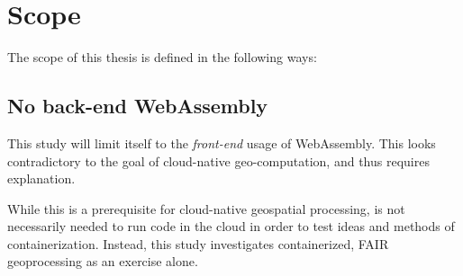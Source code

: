 






\newpage
\section{Scope}
The scope of this thesis is defined in the following ways: 


\subsection*{ No back-end WebAssembly } 
This study will limit itself to the \emph{front-end} usage of WebAssembly. This looks contradictory to the goal of cloud-native geo-computation, and thus requires explanation.

While this is a prerequisite for cloud-native geospatial processing, is not necessarily needed to run code in the cloud in order to test ideas and methods of containerization. 
Instead, this study investigates containerized, FAIR geoprocessing as an exercise alone.  


